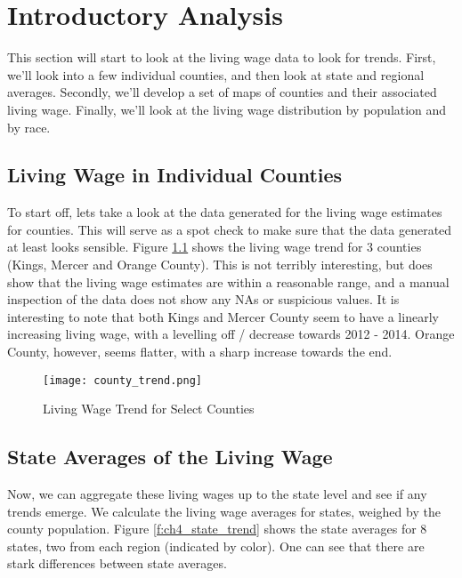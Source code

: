 \chapter{Introductory Analysis}\label{ch:intro_analysis}

This section will start to look at the living wage data to look for trends. First, we'll look into a few individual counties, and then look at state and regional averages. Secondly, we'll develop a set of maps of counties and their associated living wage. Finally, we'll look at the living wage distribution by population and by race.

\section{Living Wage in Individual Counties}

To start off, lets take a look at the data generated for the living wage estimates for counties. This will serve as a spot check to make sure that the data generated at least looks sensible. Figure \ref{f:ch4_individual} shows the living wage trend for 3 counties (Kings, Mercer and Orange County). This is not terribly interesting, but does show that the living wage estimates are within a reasonable range, and a manual inspection of the data does not show any NAs or suspicious values. It is interesting to note that both Kings and Mercer County seem to have a linearly increasing living wage, with a levelling off / decrease towards 2012 - 2014. Orange County, however, seems flatter, with a sharp increase towards the end.

\begin{figure}[H]
    \centering
        \texttt{[image: county\_trend.png]}
        \caption{Living Wage Trend for Select Counties}
    \label{f:ch4_individual}
\end{figure}


\section{State Averages of the Living Wage}

Now, we can aggregate these living wages up to the state level and see if any trends emerge. We calculate the living wage averages for states, weighed by the county population. Figure \ref{f:ch4_state_trend} shows the state averages for 8 states, two from each region (indicated by color). One can see that there are stark differences between state averages.

